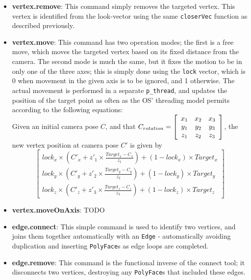 \documentclass[a4paper,10pt]{article}
\begin{document}
\begin{itemize}
\item{\textbf{vertex.remove}: This command simply removes the targeted vertex. This vertex is identified from the look-vector using the same \texttt{closerVec} function as described previously.}

\item{\textbf{vertex.move}: This command has two operation modes; the first is a free move, which moves the targeted vertex based on its fixed distance from the camera. The second mode is much the same, but it fixes the motion to be in only one of the three axes; this is simply done using the \texttt{lock} vector, which is 0 when movement in the given axis is to be ignored, and 1 otherwise. The actual movement is performed in a separate \texttt{p\_thread}, and updates the position of the target point as often as the OS' threading model permits according to the following equations:
\\

Given an initial camera pose $C$, and that $C_{rotation} = \left[
  \begin{array}{c c c}
    x_1 & x_2 & x_3 \\
    y_1 & y_2 & y_3 \\
    z_1 & z_2 & z_3
  \end{array}\right]$, the new vertex position at camera pose $C'$ is given by 
\\

$$\displaystyle \left[ 
  \begin{array}{c}
    lock_x \times (C'_x + z'_1 \times \frac{Target_x - C_x}{z_1}) + (1 - lock_x) \times Target_x \\ 
    lock_y \times (C'_y + z'_2 \times \frac{Target_y - C_y}{z_2}) + (1 - lock_y) \times Target_y \\ 
    lock_z \times (C'_z + z'_3 \times \frac{Target_z - C_z}{z_3}) + (1 - lock_z) \times Target_z
  \end{array}\right]$$
}

\item{\textbf{vertex.moveOnAxis}: TODO}

\item{\textbf{edge.connect}: This simple command is used to identify two vertices, and joins them together automatically with an \texttt{Edge} - automatically avoiding duplication and inserting \texttt{PolyFace}s as edge loops are completed.}

\item{\textbf{edge.remove}: This command is the functional inverse of the connect tool; it disconnects two vertices, destroying any \texttt{PolyFace}s that included these edges.}


\end{itemize}
\end{document}
